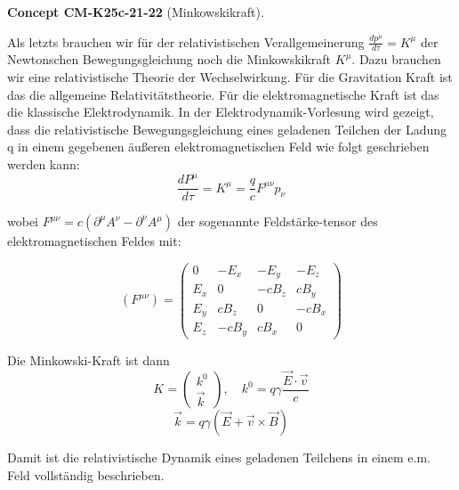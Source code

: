 \documentclass[10pt, letterpaper]{article}
\newcommand{\CustomHeading}[3]{%
  \par\medskip\noindent%
  \textbf{#1 #2} \textnormal{(#3)}.\enskip%
}
\newenvironment{CONC}[2]{\CustomHeading{Concept}{#1}{#2}}{}
\begin{document}
\begin{CONC}{CM-K25c-21-22}{Minkowskikraft}
Als letzts brauchen wir für der relativistischen Verallgemeinerung $\frac{dp^\mu}{d\tau} = K^\mu$ der Newtonschen Bewegungsgleichung noch die Minkowskikraft $K^\mu$. Dazu brauchen wir eine relativistische Theorie der Wechselwirkung. Für die Gravitation Kraft ist das die allgemeine Relativitätstheorie. Für die elektromagnetische Kraft ist das die klassische Elektrodynamik. In der Elektrodynamik-Vorlesung wird gezeigt, dass die relativistische Bewegungsgleichung eines geladenen Teilchen der Ladung q in einem gegebenen äußeren elektromagnetischen Feld wie folgt geschrieben werden kann:
\[\frac{dP^\mu}{d\tau} = K^\mu = \frac{q}{c}F^{\mu\nu}p_\nu\]

wobei $F^{\mu\nu} = c(\partial^\mu A^\nu - \partial^\nu A^\mu)$ der sogenannte Feldstärke-tensor des elektromagnetischen Feldes mit:

\[(F^{\mu\nu}) = \begin{pmatrix}
0 & -E_x & -E_y & -E_z \\
E_x & 0 & -cB_z & cB_y \\
E_y & cB_z & 0 & -cB_x \\
E_z & -cB_y & cB_x & 0
\end{pmatrix}\]

Die Minkowski-Kraft ist dann
\[K = \begin{pmatrix} k^0 \\ \vec{k} \end{pmatrix}, \quad k^0 = q\gamma \frac{\vec{E}\cdot\vec{v}}{c}\]
\[\vec{k} = q\gamma(\vec{E} + \vec{v}\times\vec{B})\]

Damit ist die relativistische Dynamik eines geladenen Teilchens in einem e.m. Feld vollständig beschrieben.
\end{CONC}
\end{document}
